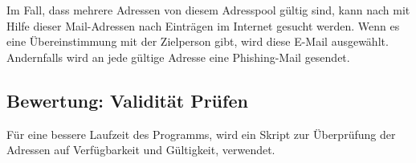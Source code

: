 Im Fall, dass mehrere Adressen von diesem Adresspool gültig sind, kann nach mit Hilfe dieser Mail-Adressen nach Einträgen im Internet gesucht werden. Wenn es eine Übereinstimmung mit der Zielperson gibt, wird diese E-Mail ausgewählt. Andernfalls wird an jede gültige Adresse eine Phishing-Mail gesendet. 

\subsection{Bewertung: Validität Prüfen}
Für eine bessere Laufzeit des Programms, wird ein Skript zur Überprüfung der Adressen auf Verfügbarkeit und Gültigkeit, verwendet.	

